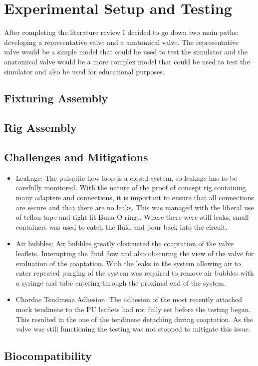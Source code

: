 \chapter{Experimental Setup and Testing}\label{ch:testing}
\vspace{-2.5em}

\mynewline
After completing the literature review I decided to go down two main paths: developing a representative valve and a anatomical valve. The representative valve would be a simple model that could be used to test the simulator and the anatomical valve would be a more complex model that could be used to test the simulator and also be used for educational purposes.

\section{Fixturing Assembly}

\section{Rig Assembly}

\section{Challenges and Mitigations}

\begin{itemize}
    \item Leakage: The pulsatile flow loop is a closed system, so leakage has to be carefully monitored. With the nature of the proof of concept rig containing many adapters and connections, it is important to ensure that all connections are secure and that there are no leaks. This was managed with the liberal use of teflon tape and tight fit Buna O-rings. Where there were still leaks, small containers was used to catch the fluid and pour back into the circuit.
    \item Air bubbles: Air bubbles greatly obstructed the coaptation of the valve leaflets. Interupting the fluid flow and also obscuring the view of the valve for evaluation of the coaptation. With the leaks in the system allowing air to enter repeated purging of the system was required to remove air bubbles with a syringe and tube entering through the proximal end of the system.
    \item Chordae Tendineae Adhesion: The adhesion of the most recently attached mock tendineae to the \gls{PU} leaflets had not fully set before the testing began. This resulted in the one of the tendineae detaching during coaptation. As the valve was still functioning the testing was not stopped to mitigate this issue.
\end{itemize}



\section{Biocompatibility}